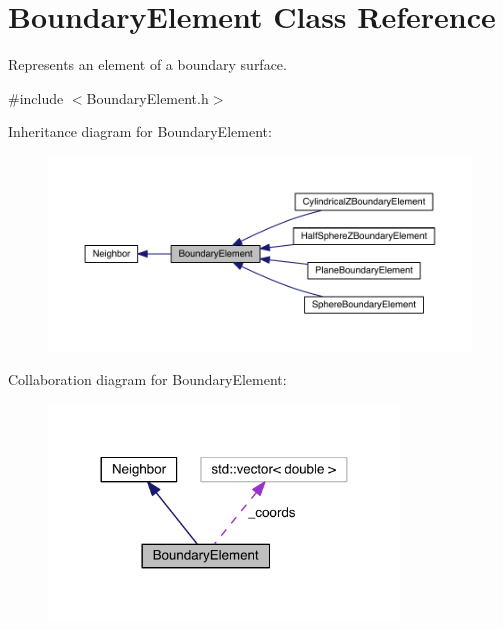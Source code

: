 \hypertarget{classBoundaryElement}{\section{Boundary\+Element Class Reference}
\label{classBoundaryElement}
}


Represents an element of a boundary surface.  




{\ttfamily \#include $<$Boundary\+Element.\+h$>$}



Inheritance diagram for Boundary\+Element\+:\nopagebreak
\begin{figure}[H]
\begin{center}
\leavevmode
\includegraphics[width=350pt]{classBoundaryElement__inherit__graph}
\end{center}
\end{figure}


Collaboration diagram for Boundary\+Element\+:\nopagebreak
\begin{figure}[H]
\begin{center}
\leavevmode
\includegraphics[width=264pt]{classBoundaryElement__coll__graph}
\end{center}
\end{figure}
